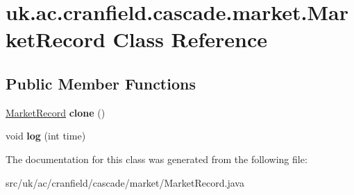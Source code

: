 \hypertarget{classuk_1_1ac_1_1cranfield_1_1cascade_1_1market_1_1_market_record}{\section{uk.\-ac.\-cranfield.\-cascade.\-market.\-Market\-Record Class Reference}
\label{classuk_1_1ac_1_1cranfield_1_1cascade_1_1market_1_1_market_record}
}
\subsection*{Public Member Functions}
\begin{DoxyCompactItemize}
\item 
\hypertarget{classuk_1_1ac_1_1cranfield_1_1cascade_1_1market_1_1_market_record_a3c444fd0dd593b159b5260ed98a4620c}{\hyperlink{classuk_1_1ac_1_1cranfield_1_1cascade_1_1market_1_1_market_record}{Market\-Record} {\bfseries clone} ()}\label{classuk_1_1ac_1_1cranfield_1_1cascade_1_1market_1_1_market_record_a3c444fd0dd593b159b5260ed98a4620c}

\item 
\hypertarget{classuk_1_1ac_1_1cranfield_1_1cascade_1_1market_1_1_market_record_a93f390908929fe17064877cffeec3e4b}{void {\bfseries log} (int time)}\label{classuk_1_1ac_1_1cranfield_1_1cascade_1_1market_1_1_market_record_a93f390908929fe17064877cffeec3e4b}

\end{DoxyCompactItemize}


The documentation for this class was generated from the following file\-:\begin{DoxyCompactItemize}
\item 
src/uk/ac/cranfield/cascade/market/Market\-Record.\-java\end{DoxyCompactItemize}
